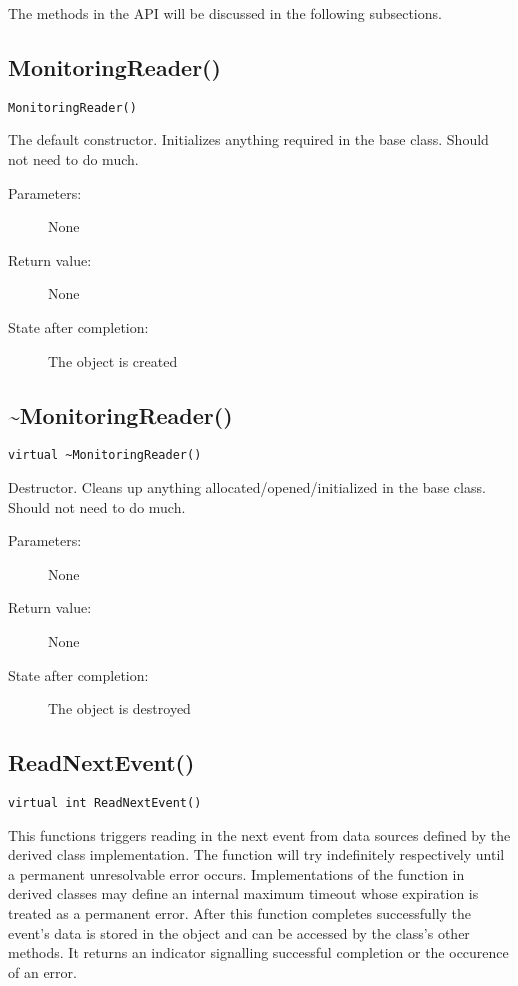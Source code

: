 \documentclass[a4paper,twoside]{article}
\begin{document}
The methods in the API will be discussed in the following subsections.


\subsection{MonitoringReader()}

\texttt{MonitoringReader()}

The default constructor. Initializes anything required in the base class. Should not need to do much.

\begin{description}
\item[Parameters:] None
\item[Return value:] None
\item[State after completion:] The object is created
\end{description}


\subsection{\~{ }MonitoringReader()}

\texttt{virtual \~{ }MonitoringReader()}

Destructor. Cleans up anything allocated/opened/initialized in the base class. Should not need to do much.

\begin{description}
\item[Parameters:] None
\item[Return value:] None
\item[State after completion:] The object is destroyed
\end{description}


\subsection{ReadNextEvent()}
\label{Subsec:MonitoringReader::ReadNextEvent}
\texttt{virtual int ReadNextEvent()}

This functions triggers reading in the next event from data sources defined by the derived class implementation. 
The function will try indefinitely respectively until a permanent unresolvable error occurs. 
Implementations of the function in derived classes may define an internal maximum timeout whose expiration is treated as a permanent error. After
this function completes successfully the event's data is stored in the object and can be accessed by the class's other methods. It returns an 
indicator signalling successful completion or the occurence of an error. 
\end{document}
